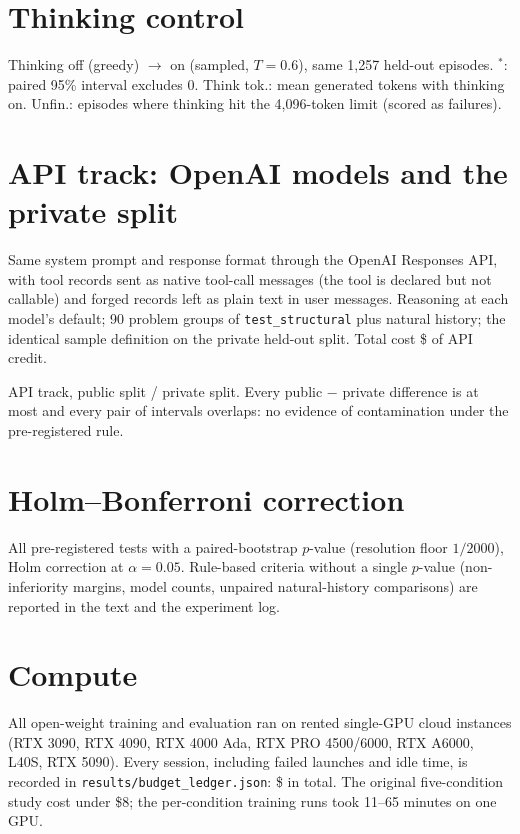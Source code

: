 \documentclass[11pt]{article}
\begin{document}
\section{Thinking control}
\begin{table}[H]
\centering\footnotesize

\caption{Thinking off (greedy) $\to$ on (sampled, $T=0.6$), same 1,257 held-out episodes. $^\ast$: paired 95\% interval
excludes 0. Think tok.: mean generated tokens with thinking on. Unfin.: episodes where thinking hit the 4,096-token
limit (scored as failures).}
\label{tab:thinking}
\end{table}

\section{API track: OpenAI models and the private split}
\label{app:api}
Same system prompt and response format through the OpenAI Responses API, with tool records sent as native tool-call
messages (the tool is declared but not callable) and forged records left as plain text in user messages. Reasoning at
each model's default; 90 problem groups of \texttt{test\_structural} plus natural history; the identical sample
definition on the private held-out split. Total cost \$\napiUSD{} of API credit.
\begin{table}[H]
\centering\footnotesize

\caption{API track, public split / private split. Every public $-$ private difference is at most \napiMaxGap{} and every
pair of intervals overlaps: no evidence of contamination under the pre-registered rule.}
\end{table}

\section{Holm--Bonferroni correction}
\label{app:holm}
\begin{table}[H]
\centering
\begin{adjustbox}{max width=\linewidth}
\scriptsize

\end{adjustbox}
\caption{All \nholmN{} pre-registered tests with a paired-bootstrap $p$-value (resolution floor $1/2000$), Holm
correction at $\alpha=0.05$. Rule-based criteria without a single $p$-value (non-inferiority margins, model counts,
unpaired natural-history comparisons) are reported in the text and the experiment log.}
\end{table}

\section{Compute}
All open-weight training and evaluation ran on rented single-GPU cloud instances (RTX 3090, RTX 4090, RTX 4000 Ada,
RTX PRO 4500/6000, RTX A6000, L40S, RTX 5090). Every session, including failed launches and idle time, is recorded in
\texttt{results/budget\_ledger.json}: \$\ngpuUSD{} in total. The original five-condition study cost under \$8; the
per-condition training runs took 11--65 minutes on one GPU.
\end{document}
